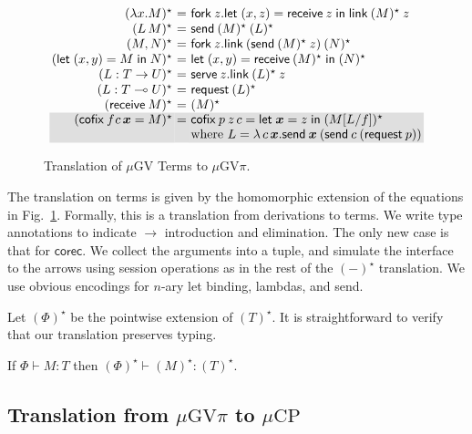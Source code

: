 \documentclass[orivec,envcountsame]{llncs}
\makeatletter
\newcommand{\gvdual}[1]{\overline{#1}}
\newcommand{\lto}{\ensuremath{\multimap}}
\newcommand{\uto}{\ensuremath{\rightarrow}}
\newcommand{\outterm}{\mkwd{end}_!}
\newcommand{\gvtyp}[3]{#1 \vdash #2 : #3}
\newcommand{\mkwd}[1]{\mathsf{#1}}
\newcommand{\gvsend}[2]{\mkwd{send}\:#1\:#2}
\newcommand{\gvreceive}[1]{\mkwd{receive}\:#1}
\newcommand{\gvlet}[3]{\mkwd{let}\;#1 = #2\;\mkwd{in}\;#3}
\newcommand{\gvlink}[2]{\mkwd{link}\:#1\:#2}
\newcommand{\gvfork}[2]{\mkwd{fork}\:#1.#2}
\newcommand{\lrkwd}{\mkwd{cofix}}
\newcommand{\gvfix}[3]{\lrkwd\:#1\:#2 = #3}
\newcommand{\gvserve}[2]{\mkwd{serve}\:#1.#2}
\newcommand{\gvrequest}[1]{\mkwd{request}\:#1}
\newcommand{\key}{\mkwd}
\newcommand{\topi}[1]{({#1})^\star}
\newcommand{\mucp}{$\mu\mathrm{CP}$\xspace}
\newcommand{\mugv}{$\mu\mathrm{GV}$\xspace}
\newcommand{\gvpi}{$\mu\mathrm{GV}\pi$\xspace}
\newcommand{\ba}{\begin{array}}
\newcommand{\ea}{\end{array}}
\newenvironment{equations}{\[\ba{@{}r@{~}c@{~}l@{}}}{\ea\]}
\newcommand\shaderow{\noalign{\vskip-0.4pt}\rowcolor{shade}[0.6mm]}
\makeatother
\begin{document}
\begin{figure}[float]\small
\begin{equations}
\topi{\lambda x.M} &=& \gvfork{z}{\gvlet{(x, z)}{\gvreceive{z}}{\gvlink{\topi{M}}{z}}} \\
\topi{L\,M} &=& \gvsend{\topi{M}}{\topi{L}} \\
\topi{M, N} &=&
  \gvfork{z}
    {\gvlink{(\gvsend{\topi{M}}{z})}{\topi{N}}} \\
\topi{\gvlet{(x, y)}{M}{N}} &=&
    \gvlet{(x, y)}{\gvreceive{\topi{M}}}{\topi{N}} \\
\topi{L : T \uto U} &=&
  \gvserve{z}{\gvlink{\topi{L}}{z}} \\
\topi{L : T \lto U} &=& \gvrequest{\topi{L}} \\
\topi{\gvreceive{M}} &=& \topi{M}
\\ \shaderow
\topi{\gvfix{f}{\!c\,\vec{x}}{M}} &=&
  \gvfix{p}{z\,c}{\gvlet{\vec{x}}{z}{\topi{M[L/f]}}} \\ \shaderow
&& \text{where }L = \lambda\,c\,\vec{x}.\gvsend{\vec{x}}{(\gvsend{c}{(\gvrequest{p})})} \\
\end{equations}%
\caption{Translation of \mugv Terms to \gvpi.}\label{fig:togvpi}
\end{figure}

The translation on terms is given by the homomorphic extension of the equations in
Fig.~\ref{fig:togvpi}.  Formally, this is a translation from derivations to terms. We write type
annotations to indicate $\to$ introduction and elimination.
%
The only new case is that for $\key{corec}$. We collect the arguments into a tuple, and simulate the
interface to the arrows using session operations as in the rest of the $\topi{-}$ translation.
%
We use obvious encodings for $n$-ary let binding, lambdas, and send.

Let $\topi{\Phi}$ be the pointwise extension of $\topi{T}$. It is straightforward to verify that our
translation preserves typing.
\begin{theorem}
If $\gvtyp{\Phi}{M}{T}$ then $\gvtyp{\topi{\Phi}}{\topi{M}}{\topi{T}}$.
\end{theorem}

\subsection{Translation from \gvpi to \mucp}\label{sec:gvpitocp}
\end{document}

